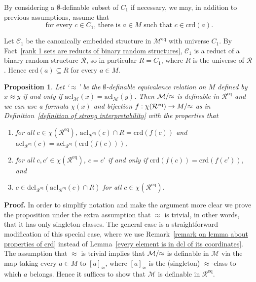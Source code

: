\documentclass[11pt, twoside]{amsart}
\newtheorem{prop}[theor]{Proposition}
\numberwithin{equation}{section}
\newcommand{\acl}{\mathrm{acl}}
\newcommand{\dcl}{\mathrm{dcl}}
\newcommand{\es}{\emptyset}
\newcommand{\nts}{\negthickspace}
\newcommand{\approxc}{\nts \approx}
\newcommand{\crd}{\mathrm{crd}}
\newcommand{\meq}{^{\mathrm{eq}}}
\newcommand{\mcC}{\mathcal{C}}
\newcommand{\mcM}{\mathcal{M}}
\newcommand{\mcR}{\mathcal{R}}
\begin{document}
\noindent
By considering a $\es$-definable subset of $C_1$ if necessary, we may, in addition to previous assumptions, assume that
\begin{equation}\label{every member of C_1 is a coordinate of M}
\text{ for every $c \in C_1$, there is $a \in M$ such that $c \in \crd(a)$.}
\end{equation}

\noindent
Let $\mcC_1$ be the canonically embedded structure in $\mcM\meq$ with universe  $C_1$.
By Fact~\ref{rank 1 sets are reducts of binary random structures}, 
$\mcC_1$ is a reduct of a binary random structure $\mcR$, so in particular $R = C_1$, where $R$ is the universe of $\mcR$.
Hence $\crd(a) \subseteq R$ for every $a \in M$.


\begin{prop}\label{M is definable in Req}
Let `$\approx$' be the $\es$-definable equivalence relation on $M$ defined by $x \approx y$ if and only if $\acl_\mcM(x) = \acl_\mcM(y)$.
Then $\mcM / \approxc$ is definable in $\mcR\meq$  and we can use a formula $\chi(x)$ and bijection $f : \chi(\mcR\meq) \to M / \approxc$
as in Definition~\ref{definition of strong interpretability} with the properties that 
\begin{enumerate}
\item for all $c \in \chi(\mcR\meq)$,
$\acl_{\mcR\meq}(c) \cap R = \crd(f(c))$ and $\acl_{\mcR\meq}(c) = \acl_{\mcR\meq}(\crd(f(c)))$, 

\item for all $c, c' \in \chi(\mcR\meq)$, $c = c'$ if and only if $\crd(f(c)) = \crd(f(c'))$, and

\item $c \in \dcl_{\mcR\meq}(\acl_{\mcR\meq}(c) \cap R)$ for all $c \in \chi(\mcR\meq)$.
\end{enumerate}
\end{prop}

\noindent
{\bf Proof.}
In order to simplify notation and make the argument more clear we prove the proposition under the extra assumption
that $\approx$ is  trivial, in other words, that it has only singleton classes. The general case is a straightforward modification of this special case,
where we use Remark~\ref{remark on lemma about properties of crd} instead of Lemma~\ref{every element is in dcl of its coordinates}.
The assumption that $\approx$ is trivial implies that $\mcM / \approxc$ is definable in $\mcM$ via the map taking every $a \in M$
to $[a]_\approx$, where $[a]_\approx$ is the (singleton) $\approx$-class to which $a$ belongs.
Hence it suffices to show that $\mcM$ is definable in $\mcR\meq$.
\end{document}
